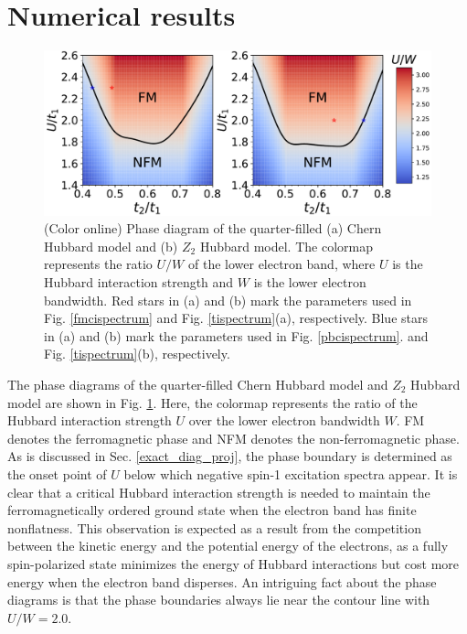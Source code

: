 \documentclass[amsmath,superscriptaddress,showpacs,aps,prb,twocolumn]{revtex4-1}
\begin{document}
\section{Numerical results}\label{nr}
\begin{figure}
\includegraphics[width=\columnwidth]{phase}
\caption{(Color online) Phase diagram of the quarter-filled (a) Chern Hubbard model and (b) $Z_2$ Hubbard model. The colormap represents the ratio $U/W$ of the lower electron band, where $U$ is the Hubbard interaction strength and $W$ is the lower electron bandwidth. Red stars in (a) and (b) mark the parameters used in Fig. \ref{fmcispectrum} and Fig. \ref{tispectrum}(a), respectively. Blue stars in (a) and (b) mark the parameters used in Fig. \ref{pbcispectrum}. and Fig. \ref{tispectrum}(b), respectively.}
\label{phase}
\end{figure}

\par The phase diagrams of the quarter-filled Chern Hubbard model and $Z_2$ Hubbard model are shown in Fig. \ref{phase}. Here, the colormap represents the ratio of the Hubbard interaction strength $U$ over the lower electron bandwidth $W$. FM denotes the ferromagnetic phase and NFM denotes the non-ferromagnetic phase. As is discussed in Sec. \ref{exact_diag_proj}, the phase boundary is determined as the onset point of $U$ below which negative spin-1 excitation spectra appear. It is clear that a critical Hubbard interaction strength is needed to maintain the ferromagnetically ordered ground state when the electron band has finite nonflatness. This observation is expected as a result from the competition between the kinetic energy and the potential energy of the electrons, as a fully spin-polarized state minimizes the energy of Hubbard interactions but cost more energy when the electron band disperses. An intriguing fact about the phase diagrams is that the phase boundaries always lie near the contour line with $U/W=2.0$.
\end{document}

